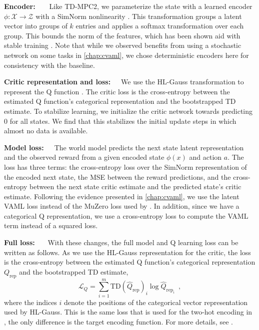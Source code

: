 \textbf{Encoder:}~~~~Like TD-MPC2, we parameterize the state with a learned encoder $\phi: \mathcal{X} \rightarrow \mathcal{Z}$ with a SimNorm nonlinearity \parencite{lavoie2023simplicial}. 
This transformation groups a latent vector into groups of $k$ entries and applies a softmax transformation over each group.
This bounds the norm of the features, which has been shown aid with stable training \parencite{hussing2024dissecting,nauman2024overestimation}.
Note that while we observed benefits from using a stochastic network on some tasks in \autoref{chap:cvaml}, we chose deterministic encoders here for consistency with the baseline.

\textbf{Critic representation and loss:}~~~We use the HL-Gauss transformation to represent the Q function \parencite{farebrother2024stop}. The critic loss is the cross-entropy between the estimated Q function's categorical representation and the bootstrapped TD estimate.
To stabilize learning, we initialize the critic network towards predicting $0$ for all states.
We find that this stabilizes the initial update steps in which almost no data is available.

\textbf{Model loss:}~~~The world model predicts the next state latent representation and the observed reward from a given encoded state $\phi(x)$ and action $a$. The loss has three terms: the cross-entropy loss over the SimNorm representation of the encoded next state, the MSE between the reward predictions, and the cross-entropy between the next state critic estimate and the predicted state's critic estimate.
Following the evidence presented in \autoref{chap:cvaml}, we use the latent VAML loss instead of the MuZero loss used by \textcite{hansen2024tdmpc}.
In addition, since we have a categorical Q representation, we use a cross-entropy loss to compute the VAML term instead of a squared loss. 

\textbf{Full loss:}~~~
With these changes, the full model and Q learning loss can be written as follows.
As we use the HL-Gauss representation \parencite{farebrother2024stop} for the critic, the loss is the cross-entropy between the estimated Q function's categorical representation $Q_\mathrm{rep}$ and the bootstrapped TD estimate,
$$\mathcal{L}_Q = \sum_{i=1}^m {\mathrm{TD}(\hat{Q}_\mathrm{rep})}_i \log \hat{Q}_{\mathrm{rep}_i}\enspace,$$
where the indices $i$ denote the positions of the categorical vector representation used by HL-Gauss.
This is the same loss that is used for the two-hot encoding in \textcite{hansen2024tdmpc}, the only difference is the target encoding function.
For more details, see \textcite{farebrother2024stop}.

